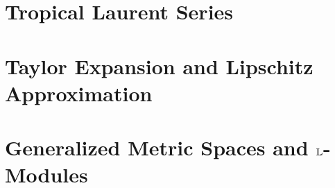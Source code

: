 \documentclass[a4paper,english, UKenglish,cleveref, autoref, thm-restate]{lipics-v2021}
\begin{document}
%
%
%


\section{Tropical Laurent Series}\label{sec:tls}



\section{Taylor Expansion and Lipschitz Approximation}\label{sec:TayLip}


\section{Generalized Metric Spaces and $\mathbb{L}$-Modules}\label{sec:GMS}




\end{document}

